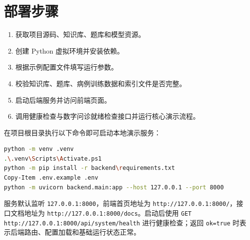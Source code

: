\section{部署步骤}

\begin{enumerate}
  \item 获取项目源码、知识库、题库和模型资源。
  \item 创建 Python 虚拟环境并安装依赖。
  \item 根据示例配置文件填写运行参数。
  \item 校验知识库、题库、病例训练数据和索引文件是否完整。
  \item 启动后端服务并访问前端页面。
  \item 调用健康检查与数字问诊就绪检查接口并运行核心演示流程。
\end{enumerate}

在项目根目录执行以下命令即可启动本地演示服务：

\begin{lstlisting}[language=bash]
python -m venv .venv
.\.venv\Scripts\Activate.ps1
python -m pip install -r backend\requirements.txt
Copy-Item .env.example .env
python -m uvicorn backend.main:app --host 127.0.0.1 --port 8000
\end{lstlisting}

服务默认监听 \texttt{127.0.0.1:8000}，前端首页地址为
\texttt{http://127.0.0.1:8000/}，接口文档地址为
\texttt{http://127.0.0.1:8000/docs}。启动后使用
\texttt{GET http://127.0.0.1:8000/api/system/health} 进行健康检查；返回
\texttt{ok=true} 时表示后端路由、配置加载和基础运行状态正常。
